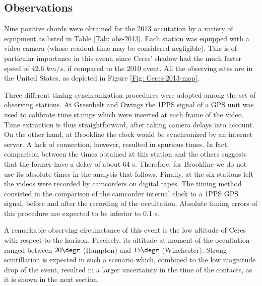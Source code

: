 \documentclass[useAMS,usenatbib]{mn2e}
\begin{document}
\subsection{Observations}\label{Sec: observation-2013}

Nine positive chords were obtained for the 2013 occutation by a variety of equipment as listed in Table \ref{Tab: obs-2013}. Each station was equipped with a video camera (whose readout time may be considered negligible). This is of particular importance in this event, since Ceres' shadow had the much faster speed of 42.6 $km/s$, if compared to the 2010 event. All the observing sites are in the United States, as depicted in Figure \ref{Fig: Ceres-2013-map}.

Three different timing synchronization procedures were adopted among the set of observing stations. At Greenbelt and Owings the 1PPS signal of a GPS unit was used to calibrate time stamps which were inserted at each frame of the video. Time extraction is thus straightforward, after taking camera delays into account. On the other hand, at Brookline the clock would be synchronized by an internet server. A lack of connection, however, resulted in spurious times. In fact, comparison between the times obtained at this station and the others suggests that the former have a delay of about 64 s. Therefore, for Brookline we do not use its absolute times in the analysis that follows. Finally, at the six stations left the videos were recorded by camcorders on digital tapes. The timing method consisted in the comparison of the camcorder internal clock to a 1PPS GPS signal, before and after the recording of the occultation. Absolute timing errors of this procedure are expected to be inferior to 0.1 s.

A remarkable observing circumstance of this event is the low altitude of Ceres with respect to the horizon. Precisely, its altitude at moment of the occultation ranged between $20\degr$ (Hampton) and $15\degr$ (Winchester). Strong scintillation is expected in such a scenario which, combined to the low magnitude drop of the event, resulted in a larger uncertainty in the time of the contacts, as it is shown in the next section.
\end{document}
